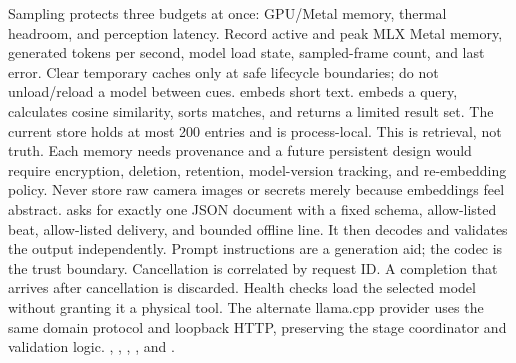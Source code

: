 {}Sampling protects three budgets at once: GPU/Metal memory, thermal headroom, and perception latency. Record active and peak MLX Metal memory, generated tokens per second, model load state, sampled-frame count, and last error. Clear temporary caches only at safe lifecycle boundaries; do not unload/reload a model between cues.\markdownRendererInterblockSeparator
{}
\markdownRendererSectionEnd 
\markdownRendererSectionEnd \markdownRendererSectionBegin
{}\markdownRendererInterblockSeparator
{} embeds short text.  embeds a query, calculates cosine similarity, sorts matches, and returns a limited result set. The current store holds at most 200 entries and is process-local.\markdownRendererParagraphSeparator
{}This is retrieval, not truth. Each memory needs provenance and a future persistent design would require encryption, deletion, retention, model-version tracking, and re-embedding policy. Never store raw camera images or secrets merely because embeddings feel abstract.\markdownRendererInterblockSeparator
{}
\markdownRendererSectionEnd \markdownRendererSectionBegin
{}\markdownRendererInterblockSeparator
{} asks for exactly one JSON document with a fixed schema, allow-listed beat, allow-listed delivery, and bounded offline line. It then decodes and validates the output independently. Prompt instructions are a generation aid; the codec is the trust boundary.\markdownRendererInterblockSeparator
{}\markdownRendererInterblockSeparator
{}Cancellation is correlated by request ID. A completion that arrives after cancellation is discarded. Health checks load the selected model without granting it a physical tool. The alternate llama.cpp provider uses the same domain protocol and loopback HTTP, preserving the stage coordinator and validation logic.\markdownRendererInterblockSeparator
{}
\markdownRendererSectionEnd \markdownRendererSectionBegin
{}\markdownRendererInterblockSeparator
{}\markdownRendererBlockQuoteBegin
{} , , , , and .\markdownRendererBlockQuoteEnd \markdownRendererInterblockSeparator
